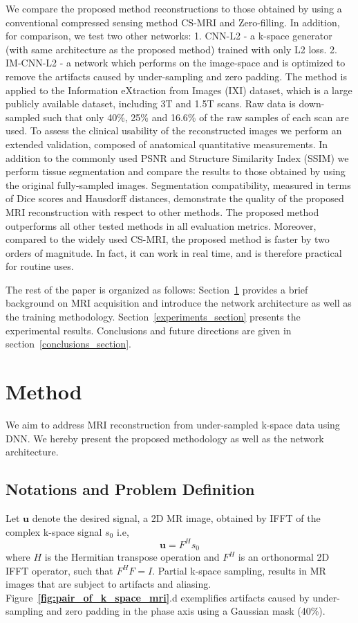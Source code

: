 \documentclass[review]{elsarticle}
\begin{document}
We compare the proposed method reconstructions to those obtained by using a conventional compressed sensing method CS-MRI \cite{lustig2007sparse} and Zero-filling. In addition, for comparison, we test two other networks: 1. CNN-L2 - a k-space generator (with same architecture as the proposed method) trained with only L2 loss. 2. IM-CNN-L2 - a network which performs on the image-space and is optimized to remove the artifacts caused by under-sampling and zero padding.
The method is applied to the Information eXtraction from Images (IXI) dataset, which is a large publicly available dataset, including 3T and 1.5T scans. Raw data is down-sampled such that only 40\%, 25\% and 16.6\% of the raw samples of each scan are used.
To assess the clinical usability of the reconstructed images we perform an extended validation, composed of anatomical quantitative measurements. In addition to the commonly used PSNR and Structure Similarity Index (SSIM) we perform tissue segmentation and compare the results to those obtained by using the original fully-sampled images.
Segmentation compatibility, measured in terms of Dice scores and Hausdorff distances, demonstrate the quality of the proposed MRI reconstruction with respect to other methods.
The proposed method outperforms all other tested methods in all evaluation metrics. Moreover, compared to the widely used CS-MRI, the proposed method is faster by two orders of magnitude. In fact, it can work in real time, and is therefore practical for routine uses.

The rest of the paper is organized as follows: Section~\ref{method_section} provides a brief background on MRI acquisition and introduce the network architecture as well as the training methodology. Section~\ref{experiments_section} presents the experimental results. Conclusions and future directions are given in section~\ref{conclusions_section}.

\section{Method}\label{method_section}
We aim to address MRI reconstruction from under-sampled k-space data using DNN. We hereby present the proposed methodology as well as the network architecture.
\subsection{Notations and Problem Definition}
Let $\bm{u}$ denote the desired signal, a 2D MR image, obtained by IFFT of the complex k-space signal $s_{0}$ i.e, 
\begin{equation}
\bm{u}=F^{H}s_{0}
\end{equation} 
where $H$ is the Hermitian transpose operation and $F^{H}$ is an orthonormal 2D IFFT operator, such that $F^{H}F=I$. 
Partial k-space sampling, results in MR images that are subject to artifacts and aliasing. 
Figure~\textbf{\ref{fig:pair_of_k_space_mri}}.d exemplifies artifacts caused by under-sampling and zero padding in the phase axis using a Gaussian mask (40\%).
\end{document}
